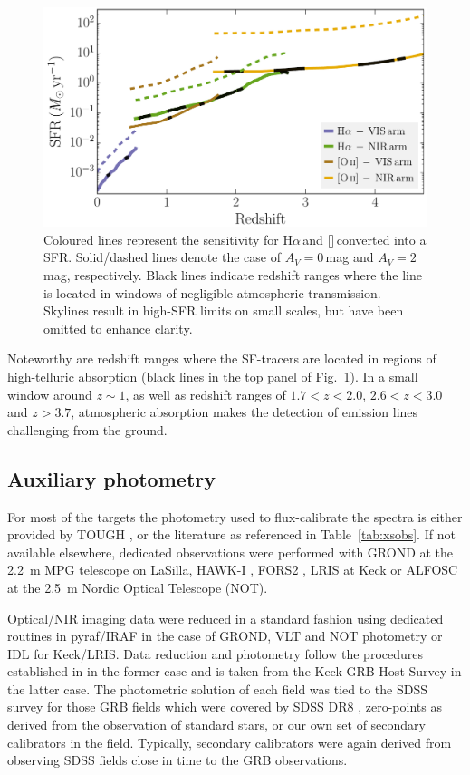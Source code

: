 \documentclass[traditabstract, longauth]{aa}
\newcommand{\ha}{H$\alpha$}
\newcommand{\oii}{[\ion{O}{ii}]}
\begin{document}
\begin{figure}
\includegraphics[angle=0, width=0.99\columnwidth]{Figs/Sensitivities_SFR.pdf}
\caption{Coloured lines represent the sensitivity for \ha\,and \oii\,converted into a SFR. Solid/dashed lines denote the case of $A_V=0$\,mag and $A_V=2$\,mag, respectively. Black lines indicate redshift ranges where the line is located in windows of negligible atmospheric transmission. Skylines result in high-SFR limits on small scales, but have been omitted to enhance clarity.}
\label{fig:sens}
\end{figure}

Noteworthy are redshift ranges where the SF-tracers are located in regions of high-telluric absorption (black lines in the top panel of Fig.~\ref{fig:sens}). In a small window around $z\sim1$, as well as redshift ranges of $1.7<z<2.0$, $2.6<z<3.0$ and $z>3.7$, atmospheric absorption makes the detection of emission lines challenging from the ground. 

\subsection{Auxiliary photometry}
\label{sec:phot}

For most of the targets the photometry used to flux-calibrate the spectra is either provided by TOUGH \citep{2012ApJ...756..187H}, or the literature as referenced in Table~\ref{tab:xsobs}. If not available elsewhere, dedicated observations were performed with GROND \citep{2008PASP..120..405G} at the 2.2~m MPG telescope on LaSilla, HAWK-I \citep{2008A&A...491..941K}, FORS2 \citep{1998Msngr..94....1A}, LRIS at Keck \citep{1995PASP..107..375O} or ALFOSC at the 2.5~m Nordic Optical Telescope (NOT).

Optical/NIR imaging data were reduced in a standard fashion using dedicated routines in pyraf/IRAF \citep{1993ASPC...52..173T} in the case of GROND, VLT and NOT photometry or IDL for Keck/LRIS. Data reduction and photometry follow the procedures established in \citet{2008ApJ...685..376K} in the former case and is taken from the Keck GRB Host Survey \citep{2013EAS....61..391P} in the latter case. The photometric solution of each field was tied to the SDSS survey for those GRB fields which were covered by SDSS DR8 \citep{2011ApJS..193...29A}, zero-points as derived from the observation of standard stars, or our own set of secondary calibrators in the field. Typically, secondary calibrators were again derived from observing SDSS fields close in time to the GRB observations. 
\end{document}
